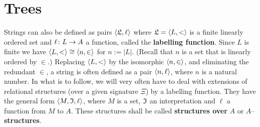 \section{Trees}
\label{kap1-4}
\label{einszwei}
%
%
%
Strings can also be defined as pairs $\langle \mathfrak{L}, \ell\rangle$
where $\mathfrak{L} = \langle L, <\rangle$ is a finite linearly ordered set
and $\ell \colon L \rightarrow A$ a function, called the \textbf{labelling
function}.
Since $L$ is finite we have $\auf L, < \zu \cong \auf n, %
\in\zu$ for $n := |L|$. (Recall that $n$ is a set that is
linearly ordered by $\in$.) Replacing $\langle L, <\rangle$ by the 
isomorphic $\langle n, \in\rangle$, and eliminating the redundant $\in$, 
a string is often defined as a pair $\langle n, \ell\rangle$, where $n$ 
is a natural number. 
In what is to follow, we will very often have to deal with extensions 
of relational structures (over a given signature $\Xi$) by a labelling 
function. They have the general form $\langle M, \mathfrak{I}, \ell\rangle$, where 
$M$ is a set, $\mathfrak{I}$ an interpretation and $\ell$ a function from $M$ 
to $A$. These structures shall be called \textbf{structures over} $A$ or 
$A$--\textbf{structures}.

